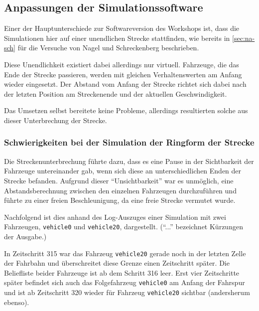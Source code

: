 \subsection{Anpassungen der Simulationssoftware}
\label{sec:anpassungen-probleme}

Einer der Hauptunterschiede zur Softwareversion des Workshops ist, dass die Simulationen hier auf einer unendlichen Strecke stattfinden, wie bereits in \cref{sec:na-sch} für die Versuche von Nagel und Schreckenberg beschrieben.

Diese Unendlichkeit existiert dabei allerdings nur virtuell.
Fahrzeuge, die das Ende der Strecke passieren, werden mit gleichen Verhaltenswerten am Anfang wieder eingesetzt.
Der Abstand vom Anfang der Strecke richtet sich dabei nach der letzten Position am Streckenende und der aktuellen Geschwindigkeit.

Das Umsetzen selbst bereitete keine Probleme, allerdings resultierten solche aus dieser Unterbrechung der Strecke.



\subsubsection{Schwierigkeiten bei der Simulation der Ringform der Strecke}
\label{sec:probleme-ringform}

Die Streckenunterbrechung führte dazu, dass es eine Pause in der Sichtbarkeit der Fahrzeuge untereinander gab, wenn sich diese an unterschiedlichen Enden der Strecke befanden.
Aufgrund dieser \enquote{Unsichtbarkeit} war es unmöglich, eine Abstandsberechnung zwischen den einzelnen Fahrzeugen durchzuführen und führte zu einer freien Beschleunigung, da eine freie Strecke vermutet wurde.

Nachfolgend ist dies anhand des Log-Auszuges einer Simulation mit zwei Fahrzeugen, \texttt{vehicle0} und \texttt{vehicle20}, dargestellt. 
(\enquote{...} bezeichnet Kürzungen der Ausgabe.)

In Zeitschritt 315 war das Fahrzeug \texttt{vehicle20} gerade noch in der letzten Zelle der Fahrbahn und überschreitet diese Grenze einen Zeitschritt später.
Die Beliefliste beider Fahrzeuge ist ab dem Schritt 316 leer.
Erst vier Zeitschritte später befindet sich auch das Folgefahrzeug \texttt{vehicle0} am Anfang der Fahrspur und ist ab Zeitschritt 320 wieder für Fahrzeug \texttt{vehicle20} sichtbar (andersherum ebenso).

